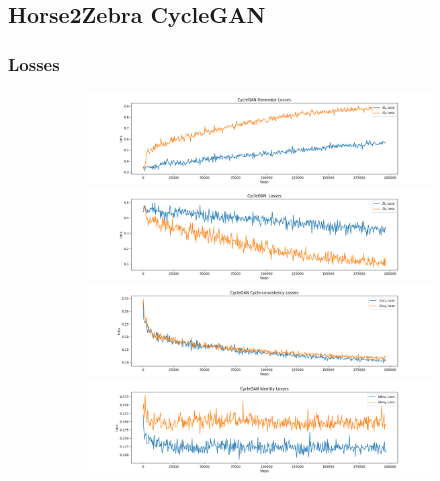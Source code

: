 \documentclass[12pt, fleqn, titlepage]{article}
\begin{document}
\subsection{Horse2Zebra CycleGAN}\label{horse2zebra_cyclegan}


\subsubsection{Losses}

\begin{figure}[H]
	\centering
	\begin{subfigure}[b]{0.8\textwidth}
		\centering
		\includegraphics[width=\linewidth]{imgs/horse2zebra_generator_losses}
		\label{fig:horse2zebra_generator_loss}
		\hfill
		\includegraphics[width=\linewidth]{imgs/horse2zebra_discriminator_losses}
		\label{fig:horse2zebra_discriminator_loss}
		\hfill
		\includegraphics[width=\linewidth]{imgs/horse2zebra_cycle_losses}
		\label{fig:horse2zebra_cycle_loss}
		\hfill
		\includegraphics[width=\linewidth]{imgs/horse2zebra_identity_losses}
		\label{fig:horse2zebra_identity_loss}
	\end{subfigure}
\end{figure}
\end{document}
